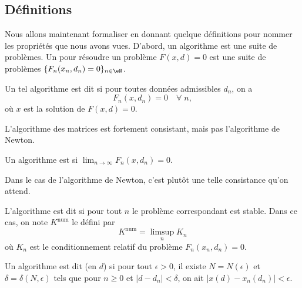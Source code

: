 \subsection{Définitions}

	Nous allons maintenant formaliser en donnant quelque définitions pour nommer les propriétés que nous avons vues. D'abord, un algorithme est une suite de problèmes. Un  pour résoudre un problème $F(x,d)=0$ est une suite de problèmes $\{F_n(x_n,d_n)=0\}_{n\in\eN}$.  

\begin{definition}
	Un tel algorithme est dit   si pour toutes données admissibles $d_n$, on a
	\begin{equation}
		F_n(x,d_n)=0\quad\forall \;n,
	\end{equation}
	où $x$ est la solution de $F(x,d)=0$.
\end{definition}
L'algorithme des matrices est fortement consistant, mais pas l'algorithme de Newton.

\begin{definition}
	Un algorithme est  si $\lim_{n\to\infty}F_n(x,d_n)=0$.
\end{definition}
Dans le cas de l'algorithme de Newton, c'est plutôt une telle consistance qu'on attend.

L'algorithme est dit  si pour tout $n$ le problème correspondant est stable.  Dans ce cas, on note $K^{\mbox{num}}$ le   défini par
\begin{equation}
	K^{\mbox{num}}=\limsup_nK_n
\end{equation}
où $K_n$ est le conditionnement relatif du problème $F_n(x_n,d_n)=0$.

\begin{definition}		\label{DefAlgoConverge}
	Un algorithme est dit  (en $d$) si pour tout $\epsilon>0$, il existe $N=N(\epsilon)$ et $\delta=\delta(N,\epsilon)$ tels que pour $n\geq0$ et $|d-d_n|<\delta$, on ait $|x(d)-x_n(d_n)|<\epsilon$.
\end{definition}

